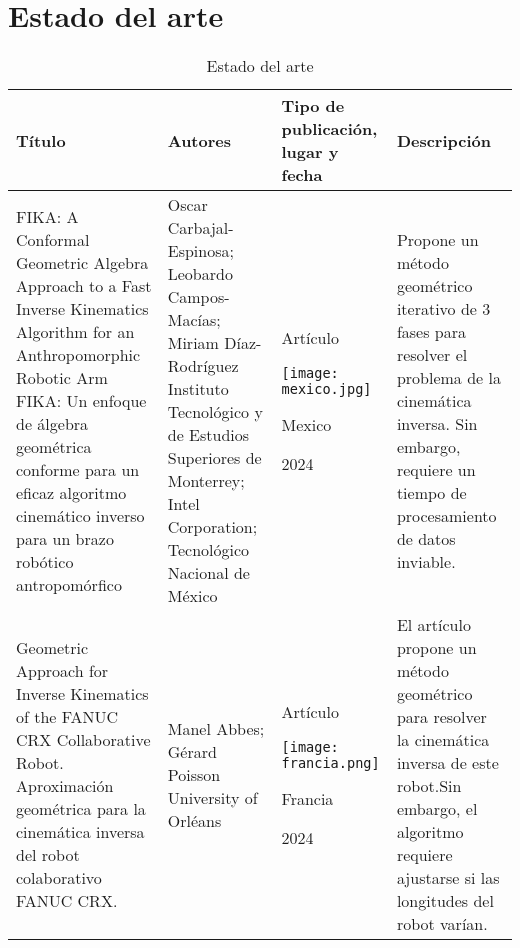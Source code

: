 \section{Estado del arte}

\begin{table}[h]
	\caption{Estado del arte}
	\begin{tabular}{p{5cm}p{4cm}p{3.6cm}p{4cm}}
		\textbf{Título} & \textbf{Autores} & \textbf{Tipo de publicación, lugar y fecha} & \textbf{Descripción} \\ 
		\midrule
		FIKA: A Conformal Geometric Algebra Approach to a Fast Inverse Kinematics Algorithm for an Anthropomorphic Robotic Arm \newline\newline
		FIKA: Un enfoque de álgebra geométrica conforme para un eficaz algoritmo cinemático inverso para un brazo robótico antropomórfico &  
		Oscar Carbajal-Espinosa; Leobardo Campos-Macías; Miriam Díaz-Rodríguez \newline\newline
		Instituto Tecnológico y de Estudios Superiores de Monterrey; Intel Corporation; Tecnológico Nacional de México & 
		\begin{center}Artículo \par \texttt{[image: mexico.jpg]} \par Mexico \par 2024\end{center} & 
		Propone un método geométrico iterativo de 3 fases para resolver el problema de la cinemática inversa.\newline\newline
		Sin embargo, requiere un tiempo de procesamiento de datos inviable.\\
		\midrule
		Geometric Approach for Inverse Kinematics of the FANUC CRX Collaborative Robot. \newline\newline
		Aproximación geométrica para la cinemática inversa del robot colaborativo FANUC CRX. &  
		Manel Abbes; Gérard Poisson \newline\newline 
		University of Orléans & 
		\begin{center}Artículo \par \texttt{[image: francia.png]} \par Francia \par 2024\end{center} & 
		El artículo propone un método geométrico para resolver la cinemática inversa de este robot.\newline\newline Sin embargo, el algoritmo requiere ajustarse si las longitudes del robot varían. \\
	\end{tabular}
\end{table}

